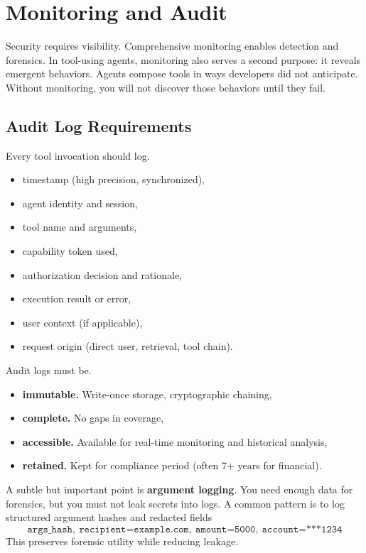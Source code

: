 \section{Monitoring and Audit}

Security requires visibility. Comprehensive monitoring enables detection and forensics. In tool-using agents, monitoring also serves a second purpose: it reveals emergent behaviors. Agents compose tools in ways developers did not anticipate. Without monitoring, you will not discover those behaviors until they fail.

\subsection{Audit Log Requirements}

Every tool invocation should log.
\begin{itemize}
\item timestamp (high precision, synchronized),
\item agent identity and session,
\item tool name and arguments,
\item capability token used,
\item authorization decision and rationale,
\item execution result or error,
\item user context (if applicable),
\item request origin (direct user, retrieval, tool chain).
\end{itemize}

Audit logs must be.
\begin{itemize}
\item \textbf{immutable.} Write-once storage, cryptographic chaining,
\item \textbf{complete.} No gaps in coverage,
\item \textbf{accessible.} Available for real-time monitoring and historical analysis,
\item \textbf{retained.} Kept for compliance period (often 7+ years for financial).
\end{itemize}

A subtle but important point is \textbf{argument logging}. You need enough data for forensics, but you must not leak secrets into logs. A common pattern is to log structured argument hashes and redacted fields
\[
\texttt{args\_hash},\ \texttt{recipient=example.com},\ \texttt{amount=5000},\ \texttt{account=***1234}
\]
This preserves forensic utility while reducing leakage.

